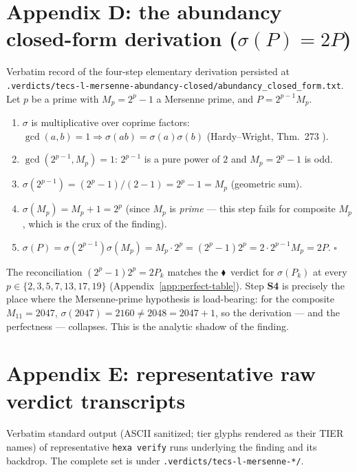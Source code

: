 \documentclass[11pt,a4paper]{article}
\newcommand{\tierF}{\textcolor{blue!60!black}{$\blacklozenge$}}   %
\newcommand{\sig}{\sigma}
\newcommand{\Mp}{M_p}
\theoremstyle{definition}
\begin{document}
\section{Appendix D: the abundancy closed-form derivation ($\sig(P)=2P$)}
\label{app:abundancy}

Verbatim record of the four-step elementary derivation persisted at
\texttt{.verdicts/tecs-l-mersenne-abundancy-closed/abundancy\_closed\_form.txt}.
Let $p$ be a prime with $\Mp = 2^p-1$ a Mersenne prime, and $P = 2^{p-1}\Mp$.

\begin{enumerate}\itemsep0.25em
\item[\textbf{S1}] $\sig$ is multiplicative over coprime factors:
$\gcd(a,b)=1 \Rightarrow \sig(ab)=\sig(a)\sig(b)$ (Hardy--Wright, Thm.\ 273
\citep{hardy-wright}).
\item[\textbf{S2}] $\gcd(2^{p-1},\Mp)=1$: $2^{p-1}$ is a pure power of $2$ and
$\Mp = 2^p-1$ is odd.
\item[\textbf{S3}] $\sig(2^{p-1}) = (2^p-1)/(2-1) = 2^p-1 = \Mp$ (geometric sum).
\item[\textbf{S4}] $\sig(\Mp) = \Mp + 1 = 2^p$ (since $\Mp$ is \emph{prime} ---
this step fails for composite $\Mp$, which is the crux of the finding).
\item[\textbf{Combine}] $\sig(P) = \sig(2^{p-1})\sig(\Mp) = \Mp\cdot 2^p =
(2^p-1)2^p = 2\cdot 2^{p-1}\Mp = 2P$. \hfill$\square$
\end{enumerate}
\noindent
The reconciliation $(2^p-1)2^p = 2P_k$ matches the \tierF\ verdict for
$\sig(P_k)$ at every $p\in\{2,3,5,7,13,17,19\}$ (Appendix~\ref{app:perfect-table}).
Step \textbf{S4} is precisely the place where the Mersenne-prime hypothesis is
load-bearing: for the composite $M_{11}=2047$, $\sig(2047)=2160 \neq 2048 =
2047+1$, so the derivation --- and the perfectness --- collapses. This is the
analytic shadow of the finding.

\section{Appendix E: representative raw verdict transcripts}
\label{app:transcripts}

Verbatim standard output (ASCII sanitized; tier glyphs rendered as their
\textsc{TIER} names) of representative \texttt{hexa verify} runs underlying the
finding and its backdrop. The complete set is under
\texttt{.verdicts/tecs-l-mersenne-*/}.
\end{document}
